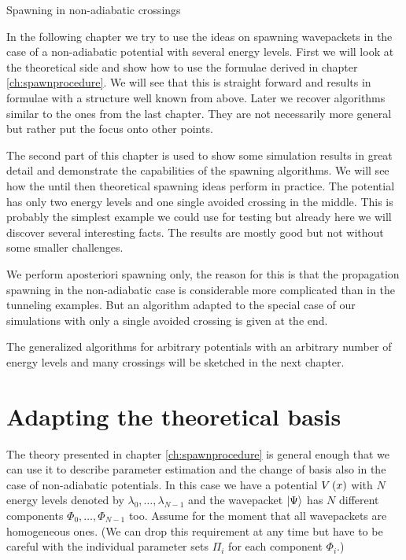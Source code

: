 \begin{chapter}{Spawning in non-adiabatic crossings}
\label{ch:spawncrossbasics}


In the following chapter we try to use the ideas on spawning wavepackets in the
case of a non-adiabatic potential with several energy levels. First we will
look at the theoretical side and show how to use the formulae derived in chapter
\ref{ch:spawnprocedure}. We will see that this is straight forward and results
in formulae with a structure well known from above. Later we recover
algorithms similar to the ones from the last chapter. They are not necessarily
more general but rather put the focus onto other points.

The second part of this chapter is used to show some simulation results in great
detail and demonstrate the capabilities of the spawning algorithms. We will
see how the until then theoretical spawning ideas perform in
practice. The potential has only two energy levels and one single avoided
crossing in the middle. This is probably the simplest example we could use
for testing but already here we will discover several interesting facts.
The results are mostly good but not without some smaller challenges.

We perform aposteriori spawning only, the reason for this is that the
propagation spawning in the non-adiabatic case is considerable more complicated
than in the tunneling examples. But an algorithm adapted to the special case of
our simulations with only a single avoided crossing is given at the end.

The generalized algorithms for arbitrary potentials with an arbitrary number
of energy levels and many crossings will be sketched in the next chapter.


\section{Adapting the theoretical basis}
\label{sec:theoretical_basis_na}

The theory presented in chapter \ref{ch:spawnprocedure} is general enough that
we can use it to describe parameter estimation and the change of basis
also in the case of non-adiabatic potentials. In this case we have a potential
$V\left( x \right)$ with $N$ energy levels denoted by $\lambda_0 ,\ldots, \lambda_{N-1}$ and the
wavepacket $\Ket{\Psi}$ has $N$ different components $\Phi_0, \ldots, \Phi_{N-1}$
too. Assume for the moment that all wavepackets are homogeneous ones. (We can drop
this requirement at any time but have to be careful with the individual parameter
sets $\Pi_i$ for each component $\Phi_i$.)


\end{chapter}
